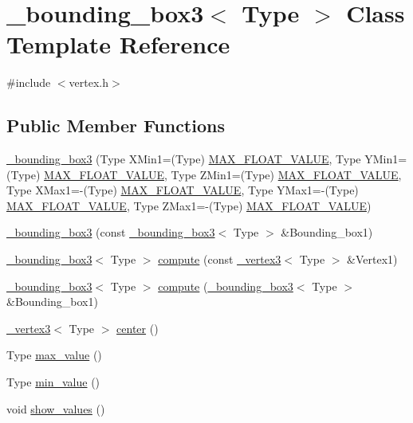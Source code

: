 \hypertarget{class__bounding__box3}{\section{\+\_\+bounding\+\_\+box3$<$ Type $>$ Class Template Reference}
\label{class__bounding__box3}
}


{\ttfamily \#include $<$vertex.\+h$>$}

\subsection*{Public Member Functions}
\begin{DoxyCompactItemize}
\item 
\hyperlink{class__bounding__box3_a0c2f1bcf8d88cc8b0d843ec0b8d93970}{\+\_\+bounding\+\_\+box3} (Type X\+Min1=(Type) \hyperlink{vertex_8h_a4b36c905d6d5c1f4c86b93ff37c897e7}{M\+A\+X\+\_\+\+F\+L\+O\+A\+T\+\_\+\+V\+A\+L\+U\+E}, Type Y\+Min1=(Type) \hyperlink{vertex_8h_a4b36c905d6d5c1f4c86b93ff37c897e7}{M\+A\+X\+\_\+\+F\+L\+O\+A\+T\+\_\+\+V\+A\+L\+U\+E}, Type Z\+Min1=(Type) \hyperlink{vertex_8h_a4b36c905d6d5c1f4c86b93ff37c897e7}{M\+A\+X\+\_\+\+F\+L\+O\+A\+T\+\_\+\+V\+A\+L\+U\+E}, Type X\+Max1=-\/(Type) \hyperlink{vertex_8h_a4b36c905d6d5c1f4c86b93ff37c897e7}{M\+A\+X\+\_\+\+F\+L\+O\+A\+T\+\_\+\+V\+A\+L\+U\+E}, Type Y\+Max1=-\/(Type) \hyperlink{vertex_8h_a4b36c905d6d5c1f4c86b93ff37c897e7}{M\+A\+X\+\_\+\+F\+L\+O\+A\+T\+\_\+\+V\+A\+L\+U\+E}, Type Z\+Max1=-\/(Type) \hyperlink{vertex_8h_a4b36c905d6d5c1f4c86b93ff37c897e7}{M\+A\+X\+\_\+\+F\+L\+O\+A\+T\+\_\+\+V\+A\+L\+U\+E})
\item 
\hyperlink{class__bounding__box3_aff41c229bea58fd5aecc9b63dc85d98a}{\+\_\+bounding\+\_\+box3} (const \hyperlink{class__bounding__box3}{\+\_\+bounding\+\_\+box3}$<$ Type $>$ \&Bounding\+\_\+box1)
\item 
\hyperlink{class__bounding__box3}{\+\_\+bounding\+\_\+box3}$<$ Type $>$ \hyperlink{class__bounding__box3_aceafabadc0dce3fd20c53e370b6d33d6}{compute} (const \hyperlink{class__vertex3}{\+\_\+vertex3}$<$ Type $>$ \&Vertex1)
\item 
\hyperlink{class__bounding__box3}{\+\_\+bounding\+\_\+box3}$<$ Type $>$ \hyperlink{class__bounding__box3_aa84517e4e88c447dec135db49224ae8b}{compute} (\hyperlink{class__bounding__box3}{\+\_\+bounding\+\_\+box3}$<$ Type $>$ \&Bounding\+\_\+box1)
\item 
\hyperlink{class__vertex3}{\+\_\+vertex3}$<$ Type $>$ \hyperlink{class__bounding__box3_a6ae994decbb466fbbd0ed4267798c611}{center} ()
\item 
Type \hyperlink{class__bounding__box3_ace4e80cd5ba1348ba63f818cc4247a6f}{max\+\_\+value} ()
\item 
Type \hyperlink{class__bounding__box3_a03d2a17bb46bb5497cd308a3fb641ae4}{min\+\_\+value} ()
\item 
void \hyperlink{class__bounding__box3_a317a925d6d203b69b0e1bd2ee0fa1295}{show\+\_\+values} ()
\end{DoxyCompactItemize}
